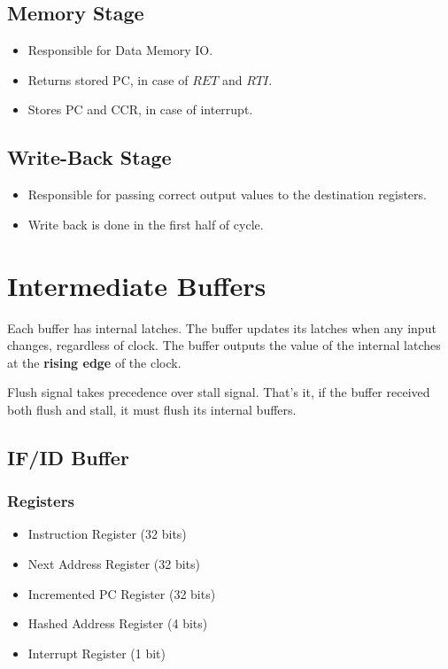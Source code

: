 \subsection{Memory Stage}
\begin{itemize}
    \item Responsible for Data Memory IO.
    \item Returns stored PC, in case of $RET$ and $RTI$.
    \item Stores PC and CCR, in case of interrupt.
\end{itemize}

\subsection{Write-Back Stage}
\begin{itemize}
    \item Responsible for passing correct output values to the destination registers.
    \item Write back is done in the first half of cycle.
\end{itemize}

\section{Intermediate Buffers}
Each buffer has internal latches. 
The buffer updates its latches when any input changes, regardless of clock. 
The buffer outputs the value of the internal latches at the \textbf{rising edge} of the clock.

Flush signal takes precedence over stall signal. That's it, if the buffer received both flush and stall, it must flush its internal buffers.
\subsection{IF/ID Buffer}
\subsubsection{Registers}
\begin{itemize}
    \item Instruction Register (32 bits)
    \item Next Address Register (32 bits)
    \item Incremented PC Register (32 bits)
    \item Hashed Address Register (4 bits)
    \item Interrupt Register (1 bit)
\end{itemize}

